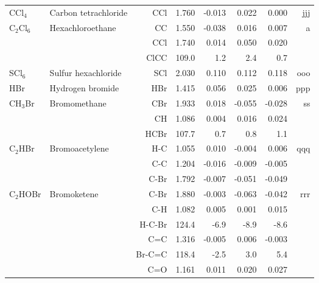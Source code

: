 \begin{table}
\begin{center}
\begin{tabular}{llrrrrrr}
 CCl$_4$        & Carbon tetrachloride               &CCl           &     1.760   &    -0.013 &     0.022 &     0.000 &   jjj \\
 C$_2$Cl$_6$       & Hexachloroethane                   &CC            &     1.550   &    -0.038 &     0.016 &     0.007 &     a \\
             &                                    &CCl           &     1.740   &     0.014 &     0.050 &     0.020 &       \\
             &                                    &ClCC        &     109.0   &       1.2 &       2.4 &       0.7   &       \\
 SCl$_6$        & Sulfur hexachloride                &SCl           &     2.030   &     0.110 &     0.112 &     0.118 &   ooo \\
 HBr         & Hydrogen bromide                   &HBr           &     1.415   &     0.056 &     0.025 &     0.006 &   ppp \\
 CH$_3$Br       & Bromomethane                       &CBr           &     1.933   &     0.018 &    -0.055 &    -0.028 &    ss \\
             &                                    &CH            &     1.086   &     0.004 &     0.016 &     0.024 &       \\
             &                                    &HCBr        &     107.7   &       0.7 &       0.8 &       1.1   &       \\
 C$_2$HBr       & Bromoacetylene                     &H-C           &     1.055   &     0.010 &    -0.004 &     0.006 &   qqq \\
             &                                    &C-C           &     1.204   &    -0.016 &    -0.009 &    -0.005 &       \\
             &                                    &C-Br          &     1.792   &    -0.007 &    -0.051 &    -0.049 &       \\
 C$_2$HOBr      & Bromoketene                        &C-Br          &     1.880   &    -0.003 &    -0.063 &    -0.042 &   rrr \\
             &                                    &C-H           &     1.082   &     0.005 &     0.001 &     0.015 &       \\
             &                                    &H-C-Br      &     124.4   &      -6.9 &      -8.9 &      -8.6   &       \\
             &                                    &C=C           &     1.316   &    -0.005 &     0.006 &    -0.003 &       \\
             &                                    &Br-C=C      &     118.4   &      -2.5 &       3.0 &       5.4   &       \\
             &                                    &C=O           &     1.161   &     0.011 &     0.020 &     0.027 &       \\
\hline
\end{tabular}
\end{center}
\end{table}
\clearpage

